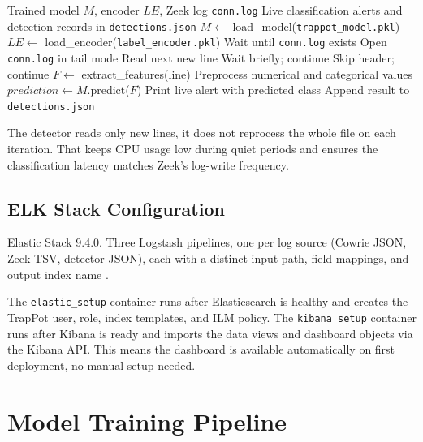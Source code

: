 \begin{algorithm}[H]
\caption{Real-Time Classification Loop}
\label{alg:realtime_classification}
\begin{algorithmic}[1]
\REQUIRE Trained model $M$, encoder $LE$, Zeek log \texttt{conn.log}
\ENSURE Live classification alerts and detection records in \texttt{detections.json}
\STATE $M \leftarrow$ load\_model(\texttt{trappot\_model.pkl})
\STATE $LE \leftarrow$ load\_encoder(\texttt{label\_encoder.pkl})
\STATE Wait until \texttt{conn.log} exists
\STATE Open \texttt{conn.log} in tail mode
\STATE Read next new line
 \STATE Wait briefly; continue \ENDIF
{} \STATE Skip header; continue \ENDIF
\STATE $F \leftarrow$ extract\_features(line) 
\STATE Preprocess numerical and categorical values
\STATE $prediction \leftarrow M$.predict($F$)
\STATE Print live alert with predicted class
\STATE Append result to \texttt{detections.json}
\ENDWHILE
\end{algorithmic}
\end{algorithm}

The detector reads only new lines, it does not reprocess the whole file on each iteration. That keeps CPU usage low during quiet periods and ensures the classification latency matches Zeek's log-write frequency.

\subsection{ELK Stack Configuration}
\label{subsec:elk_configuration}

Elastic Stack 9.4.0. Three Logstash pipelines, one per log source (Cowrie JSON, Zeek TSV, detector JSON), each with a distinct input path, field mappings, and output index name \cite{9001068,log2evt2025}.

The \texttt{elastic\_setup} container runs after Elasticsearch is healthy and creates the TrapPot user, role, index templates, and ILM policy. The \texttt{kibana\_setup} container runs after Kibana is ready and imports the data views and dashboard objects via the Kibana API. This means the dashboard is available automatically on first deployment, no manual setup needed.

\section{Model Training Pipeline}
\label{sec:model_training_pipeline}

